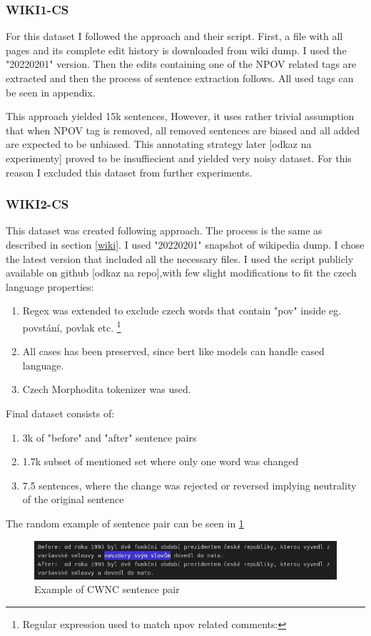 \subsubsection{WIKI1-CS}
For this dataset I followed the \cite{aleksandrova2019multilingual} approach and their script. First, a file with all pages and its complete edit history is downloaded from wiki dump. I used the "20220201" version. Then the edits containing one of the NPOV related tags are extracted and then the process of sentence extraction follows. All used tags can be seen in appendix.

This approach yielded 15k sentences, However, it uses rather trivial assumption that when NPOV tag is removed, all removed sentences are biased and all added are expected to be unbiased. This annotating strategy later [odkaz na experimenty] proved to be insuffiecient and yielded very noisy dataset. For this reason I excluded this dataset from further experiments.

\subsubsection{WIKI2-CS}
This dataset was created following \cite{pryzant2020automatically} approach. The process is the same as described in section \ref{wiki}. I used "20220201" snapshot of wikipedia dump. I chose the latest version that included all the necessary files.
I used the script publicly available on github [odkaz na repo],with few slight modifications to fit the czech language properties:
\begin{enumerate}
    \item Regex was extended to exclude czech words that contain "pov" inside eg. povstání, povlak etc. \footnote{Regular expression used to match npov related comments: }
    \item All cases has been preserved, since bert like models can handle cased language.
    \item Czech Morphodita tokenizer was used.
\end{enumerate}
\newpage
Final dataset consists of:
\begin{enumerate}
    \item 3k of "before" and "after" sentence pairs
    \item 1.7k subset of mentioned set where only one word was changed
    \item 7.5 sentences, where the change was rejected or reversed implying neutrality of the original sentence
\end{enumerate}

The random example of sentence pair can be seen in \ref{fig:wiki2cs-example}

\begin{figure}
  \includegraphics[width=\linewidth]{my_modules/multimedia/wiki2example.jpg}
  \caption{Example of CWNC sentence pair}
  \label{fig:wiki2cs-example}
\end{figure}

